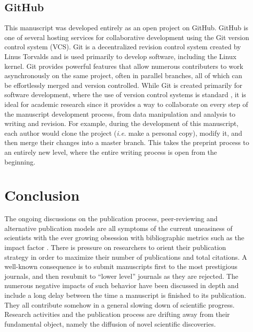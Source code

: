 \documentclass[letterpaper,twocolumn,superscriptaddress,showkeys,longbibliography]{revtex4-1}
\begin{document}
\subsection{GitHub}

This manuscript was developed entirely as an open project on GitHub. GitHub is
one of several hosting services for collaborative development using the Git
version control system (VCS).  Git is a decentralized revision control system
created by Linus Torvalds and is used primarily to develop software, including
the Linux kernel. Git provides powerful features that allow numerous
contributers to work asynchronously on the same project, often in parallel
branches, all of which can be effortlessly merged and version controlled.  While
Git is created primarily for software development, where the use of version
control systems is standard \cite{aru12}, it is ideal for academic research
since it provides a way to collaborate on every step of the manuscript
development process, from data manipulation and analysis to writing and
revision. For example, during the development of this manuscript, each author
would clone the project (\emph{i.e.} make a personal copy), modify it, and then
merge their changes into a master branch. This takes the preprint process to an
entirely new level, where the entire writing process is open from the beginning.

\section{Conclusion}

The ongoing discussions on the publication process, peer-reviewing and
alternative publication models are all symptoms of the current uneasiness of
scientists with the ever growing obsession with bibliographic metrics such as
the impact factor \cite{Fisher2012}. There is pressure on researchers to orient
their publication strategy in order to maximize their number of publications and
total citations. A well-known consequence is to submit manuscripts first to the
most prestigious journals, and then resubmit to ``lower level'' journals as they
are rejected. The numerous negative impacts of such behavior have been discussed
in depth \cite{hoc09} and include a long delay between the time a manuscript is
finished to its publication.  They all contribute somehow in a general slowing
down of scientific progress.  Research activities and the publication process
are drifting away from their fundamental object, namely the diffusion of novel
scientific discoveries. 
\end{document}
